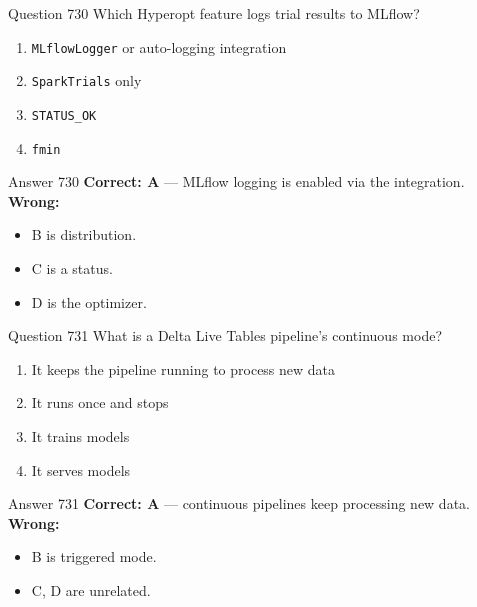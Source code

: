 \documentclass[aspectratio=169,11pt]{beamer}
\begin{document}
	\begin{frame}{Question 730}
		Which Hyperopt feature logs trial results to MLflow?
		\begin{enumerate}[label=\Alph*.]
			\item \texttt{MLflowLogger} or auto-logging integration
			\item \texttt{SparkTrials} only
			\item \texttt{STATUS\_OK}
			\item \texttt{fmin}
		\end{enumerate}
	\end{frame}
	\begin{frame}{Answer 730}
		\textbf{Correct: A} --- MLflow logging is enabled via the integration.\\
		\vspace{0.5em}
		\textbf{Wrong:}
		\begin{itemize}
			\item B is distribution.
			\item C is a status.
			\item D is the optimizer.
		\end{itemize}
	\end{frame}
	
	\begin{frame}{Question 731}
		What is a Delta Live Tables pipeline's continuous mode?
		\begin{enumerate}[label=\Alph*.]
			\item It keeps the pipeline running to process new data
			\item It runs once and stops
			\item It trains models
			\item It serves models
		\end{enumerate}
	\end{frame}
	\begin{frame}{Answer 731}
		\textbf{Correct: A} --- continuous pipelines keep processing new data.\\
		\vspace{0.5em}
		\textbf{Wrong:}
		\begin{itemize}
			\item B is triggered mode.
			\item C, D are unrelated.
		\end{itemize}
	\end{frame}
	
\end{document}
